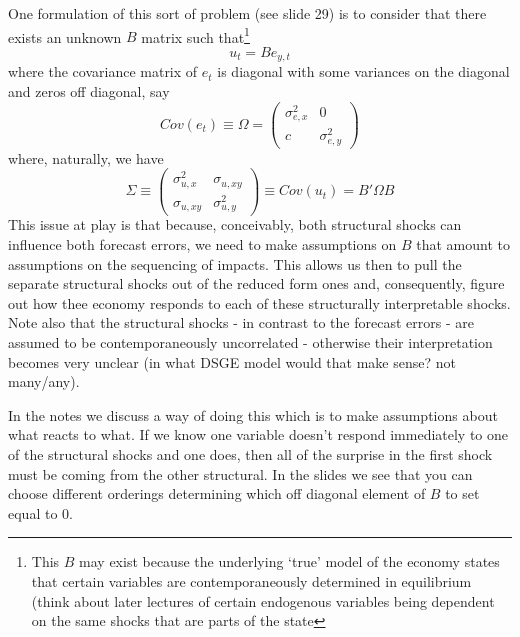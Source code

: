 \documentclass[authoryear,11pt]{elsarticle}
\begin{document}
One formulation of this sort of problem (see slide 29) is to consider that there exists an unknown $B$ matrix such that\footnote{This $B$ may exist because the underlying `true' model of the economy states that certain variables are contemporaneously determined in equilibrium (think about later lectures of certain endogenous variables being dependent on the same shocks that are parts of the state}
\begin{equation}
u_{t} = B e_{y,t}
\end{equation}
where the covariance matrix of $e_{t}$ is diagonal with some variances on the diagonal and zeros off diagonal, say
\begin{equation}
Cov(e_{t}) \equiv \Omega = \begin{pmatrix}
\sigma_{e,x}^{2} & 0 \\
c & \sigma_{e,y}^{2}
\end{pmatrix}
\end{equation}
where, naturally, we have
\begin{equation}
\Sigma \equiv \begin{pmatrix}
\sigma_{u,x}^{2} & \sigma_{u,xy} \\
\sigma_{u,xy} & \sigma_{u,y}^{2}
\end{pmatrix} \equiv  Cov(u_{t}) = B'\Omega B \label{eqn:cov_relation}
\end{equation}
This issue at play is that because, conceivably, both structural shocks can influence both forecast errors, we need to make assumptions on $B$   that amount to assumptions on the sequencing of impacts. This allows us then to pull the separate structural shocks out of the reduced form ones and, consequently, figure out how thee economy responds to each of these structurally interpretable shocks. Note also that the structural shocks - in contrast to the forecast errors - are assumed to be contemporaneously uncorrelated - otherwise their interpretation becomes very unclear (in what DSGE model would that make sense? not many/any).

In the notes we discuss a way of doing this which is to make assumptions about what reacts to what. If we know one variable doesn't respond immediately to one of the structural shocks and one does, then all of the surprise in the first shock must be coming from the other structural. In the slides we see that you can choose different orderings determining which off diagonal element of $B$ to set equal to $0$. 
\end{document}
